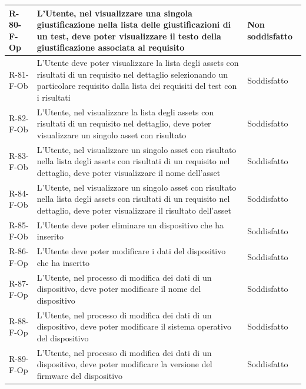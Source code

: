 \documentclass[a4paper,12pt]{article}
\begin{document}
{{\begin{longtable}{|l|p{}|p{}|}
                R-80-F-Op       & L'Utente, nel visualizzare una singola giustificazione nella lista delle giustificazioni di un test, deve poter visualizzare il testo della giustificazione associata al requisito          & Non soddisfatto \\ \hline
                R-81-F-Ob       & L'Utente deve poter visualizzare la lista degli assets con risultati di un requisito nel dettaglio selezionando un particolare requisito dalla lista dei requisiti del test con i risultati & Soddisfatto \\ \hline
                R-82-F-Ob       & L'Utente, nel visualizzare la lista degli assets con risultati di un requisito nel dettaglio, deve poter visualizzare un singolo asset con risultato                                        & Soddisfatto \\ \hline
                R-83-F-Ob       & L'Utente, nel visualizzare un singolo asset con risultato nella lista degli assets con risultati di un requisito nel dettaglio, deve poter visualizzare il nome dell'asset                  & Soddisfatto \\ \hline
                R-84-F-Ob       & L'Utente, nel visualizzare un singolo asset con risultato nella lista degli assets con risultati di un requisito nel dettaglio, deve poter visualizzare il risultato dell'asset             & Soddisfatto \\ \hline
                R-85-F-Ob       & L'Utente deve poter eliminare un dispositivo che ha inserito                                                                                                                                & Soddisfatto \\ \hline
                R-86-F-Op       & L'Utente deve poter modificare i dati del dispositivo che ha inserito                                                                                                                       & Soddisfatto \\ \hline
                R-87-F-Op       & L'Utente, nel processo di modifica dei dati di un dispositivo, deve poter modificare il nome del dispositivo                                                                                & Soddisfatto \\ \hline
                R-88-F-Op       & L'Utente, nel processo di modifica dei dati di un dispositivo, deve poter modificare il sistema operativo del dispositivo                                                                   & Soddisfatto \\ \hline
                R-89-F-Op       & L'Utente, nel processo di modifica dei dati di un dispositivo, deve poter modificare la versione del firmware del dispositivo                                                               & Soddisfatto \\ \hline

\end{longtable}}}
\end{document}
